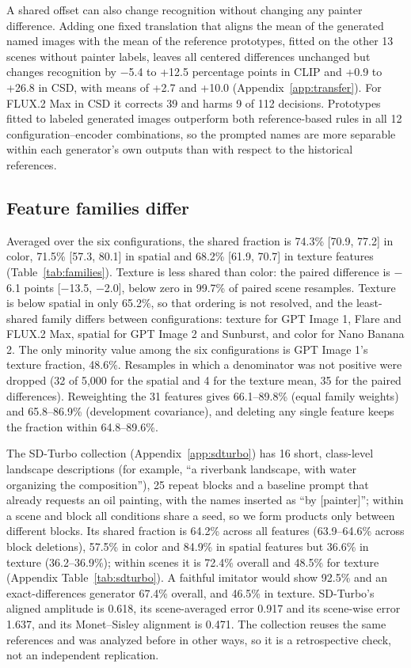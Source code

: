 \documentclass[10pt]{article}
\begin{document}
A shared offset can also change recognition without changing any painter difference. Adding one
fixed translation that aligns the mean of the generated named images with the mean of the
reference prototypes, fitted on the other 13 scenes without painter labels, leaves all centered
differences unchanged but changes recognition by $-$5.4 to +12.5 percentage points in CLIP and
+0.9 to +26.8 in CSD, with means of +2.7 and +10.0 (Appendix~\ref{app:transfer}). For FLUX.2 Max
in CSD it corrects 39 and harms 9 of 112 decisions. Prototypes fitted to labeled generated images
outperform both reference-based rules in all 12 configuration--encoder combinations, so the
prompted names are more separable within each generator's own outputs than with respect to the
historical references.

\subsection{Feature families differ}\label{sec:families}



Averaged over the six configurations, the shared fraction is 74.3\% [70.9, 77.2] in color, 71.5\%
[57.3, 80.1] in spatial and 68.2\% [61.9, 70.7] in texture features (Table~\ref{tab:families}).
Texture is less shared than color: the paired difference is $-$6.1 points [$-$13.5, $-$2.0], below
zero in 99.7\% of paired scene resamples. Texture is below spatial in only 65.2\%, so that ordering
is not resolved, and the least-shared family differs between configurations: texture for GPT Image
1, Flare and FLUX.2 Max, spatial for GPT Image 2 and Sunburst, and color for Nano Banana 2. The only
minority value among the six configurations is GPT Image 1's texture fraction, 48.6\%. Resamples in
which a denominator was not positive were dropped (32 of 5,000 for the spatial and 4 for the texture
mean, 35 for the paired differences). Reweighting the 31 features gives 66.1--89.8\% (equal family
weights) and 65.8--86.9\% (development covariance), and deleting any single feature keeps the
fraction within 64.8--89.6\%.

The SD-Turbo collection (Appendix~\ref{app:sdturbo}) has 16 short, class-level landscape
descriptions (for example, ``a riverbank landscape, with water organizing the composition''), 25
repeat blocks and a baseline prompt that already requests an oil painting, with the names inserted
as ``by [painter]''; within a scene and block all conditions share a seed, so we form products only
between different blocks. Its shared fraction is 64.2\% across all features (63.9--64.6\% across
block deletions), 57.5\% in color and 84.9\% in spatial features but 36.6\% in texture
(36.2--36.9\%); within scenes it is 72.4\% overall and 48.5\% for texture (Appendix
Table~\ref{tab:sdturbo}). A faithful imitator would show 92.5\% and an exact-differences generator
67.4\% overall, and 46.5\% in texture. SD-Turbo's aligned amplitude is 0.618, its scene-averaged
error 0.917 and its scene-wise error 1.637, and its Monet--Sisley alignment is 0.471. The
collection reuses the same references and was analyzed before in other ways, so it is a
retrospective check, not an independent replication.
\end{document}
